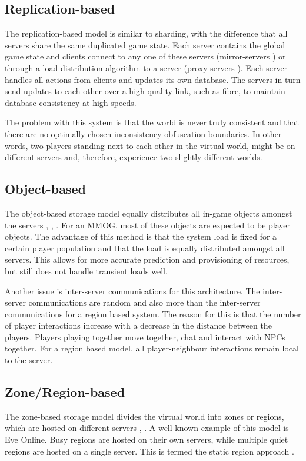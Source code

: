 \subsection{Replication-based}
The replication-based model is similar to sharding, with the difference that all servers share the same duplicated game state. Each server contains
the global game state and clients connect to any one of these servers (mirror-servers \cite{mirrored_server}) or through a load distribution
algorithm to a server (proxy-servers \cite{proxy_server_dist}). Each server handles all actions from clients and updates its own database. The
servers in turn send updates to each other over a high quality link, such as fibre, to maintain database consistency at high speeds.

The problem with this system is that the world is never truly consistent and that there are no optimally chosen inconsistency obfuscation boundaries.
In other words, two players standing next to each other in the virtual world, might be on different servers and, therefore, experience two slightly
different worlds.

\subsection{Object-based}
The object-based storage model equally distributes all in-game objects amongst the servers \cite{object_based_consistency1}, \cite{object_based_consistency2}, \cite{object_based_consistency3}. For an MMOG, most of these objects are expected to be player objects. The advantage of this method is that the system load is fixed for a certain player population and that the load is equally distributed amongst all servers. This allows for more accurate prediction and provisioning of resources, but still does not handle transient loads
well.

Another issue is inter-server communications for this architecture. The inter-server communications are random and also more than the inter-server
communications for a region based system. The reason for this is that the number of player interactions increase with a decrease in the distance
between the players. Players playing together move together, chat and interact with NPCs together. For a region based model, all player-neighbour
interactions remain local to the server.

\subsection{Zone/Region-based}
The zone-based storage model divides the virtual world into zones or regions, which are hosted on different
servers \cite{zone_based_stat}, \cite{zone_based_dyn}. A well known example of this model is Eve Online. Busy regions are hosted on their own
servers, while multiple quiet regions are hosted on a single server. This is termed the static region approach \cite{zone_based_stat}.

